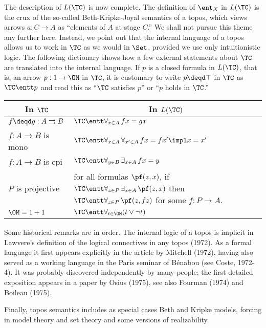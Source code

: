 The description of $L(\TC)$ is now complete.
The definition of $\ent_X$ in $L(\TC)$ is the crux of the
so-called Beth-Kripke-Joyal semantics of a topos, which
views arrows $a: C \to A$ as ``elements of $A$ at stage $C$.''
We shall not pursue this theme
any further here. Instead, we point out that the internal
language of a topos allows us to work in $\TC$ as we would in $\Set$, provided
we use only intuitionistic logic. The following dictionary shows how a few
external statements about $\TC$ are translated into the internal language.
If $p$ is a closed formula in $L(\TC)$, that is, an arrow $p: 1 \to \OM$
in $\TC$, it is customary to write $p \deqd \top$ in $\TC$ as
$\TC \entt p$ and read this as ``$\TC$ satisfies $p$'' or
``$p$ holds in $\TC$.''

\begin{center}
\begin{tabular}{ l | l }
\multicolumn{1}{c}{In $\TC$} & \multicolumn{1}{c}{In $L(\TC)$} \\
 \hline
 $f \deqd g : A \rightrightarrows B$ & $\TC \entt \forall_{x\in A}\, fx = gx$ \\
 $f: A \to B$ is mono & $\TC \entt \forall_{x\in A}\, \forall_{x'\in A}\, fx = fx' \impl x = x'$\\
 $f: A \to B$ is epi & $\TC \entt \forall_{y\in B}\, \exists_{x\in A}\, fx = y$\\
 $P$ is projective & \begin{minipage}[t]{50mm}
for all formulas $\pf(z,x)$, if $\TC \entt \forall_{z\in P}\,\exists_{x \in A}\, \pf(z,x)$
then $\TC \entt \forall_{z\in P}\, \pf(z,fz)$
for some $f : P \to A$.
\end{minipage}\\[3.5em]
$\OM = 1 + 1$ & $\TC \entt \forall_{t\in \OM} (t \vee \neg t)$\\
 \hline
\end{tabular}
\end{center}
\medskip
Some historical remarks are in order. The internal logic of a topos is
implicit in Lawvere's definition of the logical connectives in any topos
(1972). As a formal language it first appears explicitly in the article by
Mitchell (1972), having also served as a working language in the Paris seminar
of B\'enabou (see Coste, 1972-4). It was probably discovered independently by
many people; the first detailed exposition appears in a paper by Osius (1975),
see also Fourman (1974) and Boileau (1975).

Finally, topos semantics includes as special cases Beth and Kripke models,
forcing in model theory and set theory and some versions of realizability.

